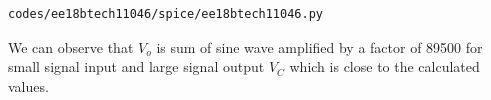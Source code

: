 \begin{enumerate}[label=\thesection.\arabic*.,ref=\thesection.\theenumi]
\begin{lstlisting}
codes/ee18btech11046/spice/ee18btech11046.py
\end{lstlisting}
We can observe that $V_{o}$ is sum of sine wave amplified by a factor of 89500 for small signal input and large signal output $V_{C}$ which is close to the calculated values.














\end{enumerate}
